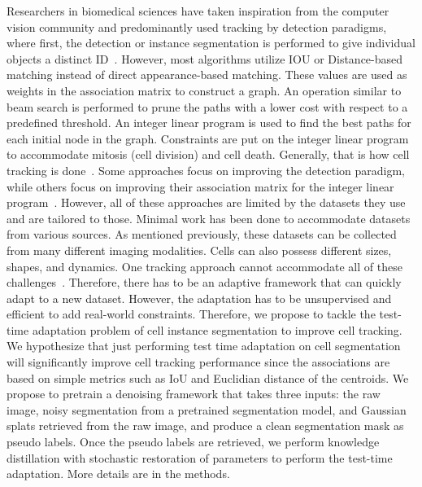 Researchers in biomedical sciences have taken inspiration from the computer vision community and predominantly used tracking by detection paradigms, where first, the detection or instance segmentation is performed to give individual objects a distinct ID~\cite{bragantini2024ultrack,ershov2022trackmate}. However, most algorithms utilize IOU or Distance-based matching instead of direct appearance-based matching. These values are used as weights in the association matrix to construct a graph. An operation similar to beam search is performed to prune the paths with a lower cost with respect to a predefined threshold.  An integer linear program is used to find the best paths for each initial node in the graph. Constraints are put on the integer linear program to accommodate mitosis (cell division) and cell death. Generally, that is how cell tracking is done~\cite{mavska2023cell}. Some approaches focus on improving the detection paradigm, while others focus on improving their association matrix for the integer linear program~\cite{mavska2023cell}. However, all of these approaches are limited by the datasets they use and are tailored to those. Minimal work has been done to accommodate datasets from various sources. As mentioned previously, these datasets can be collected from many different imaging modalities. Cells can also possess different sizes, shapes, and dynamics. One tracking approach cannot accommodate all of these challenges~\cite{chen2024cmtt}. Therefore, there has to be an adaptive framework that can quickly adapt to a new dataset. However, the adaptation has to be unsupervised and efficient to add real-world constraints. Therefore, we propose to tackle the test-time adaptation problem of cell instance segmentation to improve cell tracking.\\

We hypothesize that just performing test time adaptation on cell segmentation will significantly improve cell tracking performance since the associations are based on simple metrics such as IoU and Euclidian distance of the centroids. We propose to pretrain a denoising framework that takes three inputs: the raw image, noisy segmentation from a pretrained segmentation model, and Gaussian splats retrieved from the raw image, and produce a clean segmentation mask as pseudo labels. Once the pseudo labels are retrieved, we perform knowledge distillation with stochastic restoration of parameters to perform the test-time adaptation. More details are in the methods.   
